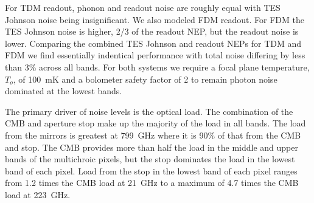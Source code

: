 \documentclass[]{spie}  %
\begin{document}
For TDM readout, phonon and readout noise are roughly equal with TES Johnson noise being insignificant.  We also modeled 
FDM readout.  For FDM the TES Johnson noise is higher, 2/3 of the readout NEP, but the readout 
noise is lower.  Comparing the combined TES Johnson and readout NEPs for TDM and FDM we find essentially indentical performance 
with total noise differing by less than 3\% across all bands.  For both systems we require a focal plane temperature, $T_o$, of 
100~mK and a bolometer safety factor of 2 to remain photon noise dominated at the lowest bands.

The primary driver of noise levels is the optical load.  The combination of the CMB and aperture stop make up the majority of the load in all bands.
The load from the mirrors is greatest at 799~GHz where it is 90\% of that from the CMB and stop. The CMB provides more than half the load 
in the middle and upper bands of the multichroic pixels, but the stop dominates the load in the lowest band of each pixel.  Load from the 
stop in the lowest band of each pixel ranges from 1.2 times the CMB load at 21~GHz to a maximum of 4.7 times the CMB load at 223~GHz. 


\end{document}
